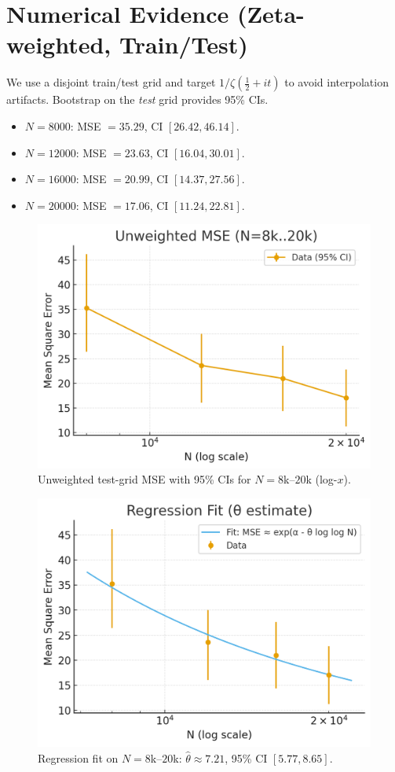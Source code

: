 \documentclass[11pt]{article}
\theoremstyle{remark}
\begin{document}
\section{Numerical Evidence (Zeta-weighted, Train/Test)}
We use a disjoint train/test grid and target $1/\zeta(\tfrac12+it)$ to avoid interpolation artifacts. Bootstrap on the \emph{test} grid provides 95\% CIs.

\begin{itemize}
\item $N=8000$: MSE $=35.29$, CI $[26.42,46.14]$.
\item $N=12000$: MSE $=23.63$, CI $[16.04,30.01]$.
\item $N=16000$: MSE $=20.99$, CI $[14.37,27.56]$.
\item $N=20000$: MSE $=17.06$, CI $[11.24,22.81]$.
\end{itemize}

\begin{figure}[ht]
\centering
\includegraphics[width=.8\linewidth]{figures/mse_unweighted.png}
\caption{Unweighted test-grid MSE with 95\% CIs for $N=8$k--$20$k (log-$x$).}
\end{figure}

\begin{figure}[ht]
\centering
\includegraphics[width=.8\linewidth]{figures/regression_fit.png}
\caption{Regression fit on $N=8$k--$20$k: $\hat\theta\approx 7.21$, 95\% CI $[5.77,8.65]$.}
\end{figure}
\end{document}
